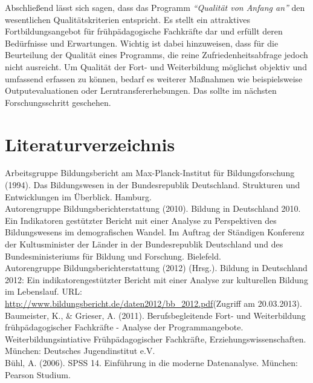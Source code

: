 \documentclass[12pt,a4paper]{article}
\begin{document}
Abschließend lässt sich sagen, dass das Programm \textit{"`Qualität von Anfang an"'} den wesentlichen Qualitätskriterien entspricht. Es stellt ein attraktives Fortbildungsangebot für frühpädagogische Fachkräfte dar und erfüllt deren Bedürfnisse und Erwartungen. 
Wichtig ist dabei hinzuweisen, dass für die Beurteilung der Qualität eines Programms, die reine Zufriedenheitsabfrage jedoch nicht ausreicht. Um Qualität der Fort- und Weiterbildung möglichst objektiv und umfassend erfassen zu können, bedarf es weiterer Maßnahmen wie beispielsweise Outputevaluationen oder Lerntransfererhebungen. Das sollte im nächsten Forschungsschritt  geschehen. 



\pagebreak

 

\section*{Literaturverzeichnis}

Arbeitsgruppe Bildungsbericht am Max-Planck-Institut für Bildungsforschung (1994). Das Bildungswesen in der Bundesrepublik Deutschland. Strukturen und Entwicklungen im Überblick. Hamburg.\\

Autorengruppe Bildungsberichterstattung (2010). 
Bildung in Deutschland 2010. Ein Indikatoren gestützter Bericht mit einer Analyse zu Perspektiven des Bildungswesens im demografischen Wandel. Im Auftrag der Ständigen Konferenz der Kultusminister der Länder in der Bundesrepublik Deutschland und des Bundesministeriums für Bildung und Forschung. Bielefeld.\\

Autorengruppe Bildungsberichterstattung (2012) (Hrsg.). Bildung in Deu\-tsch\-land 2012: Ein indikatorengestützter Bericht mit einer Analyse zur kulturellen Bildung im Lebenslauf.
URL: \url{http://www.bildungsbericht.de/daten2012/bb_2012.pdf}(Zugriff am 20.03.2013).\\

Baumeister, K., \& Grieser, A. (2011). Berufsbegleitende Fort- und Weiterbildung frühpädagogischer Fachkräfte - Analyse der Programmangebote. Weiterbildungsintiative Frühpädagogischer Fachkräfte, Erziehungswissenschaften. München: Deutsches Jugendinstitut e.V.\\

Bühl, A. (2006). SPSS 14. Einführung in die moderne Datenanalyse. München: Pearson Studium.\\
\end{document}
